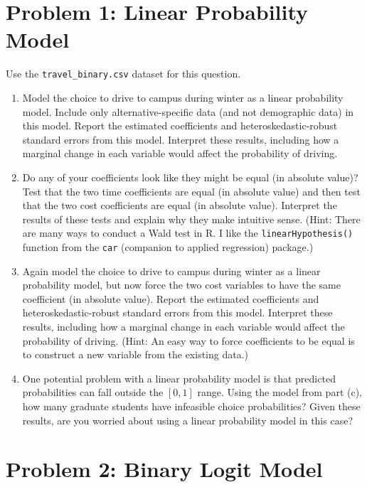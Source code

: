 \documentclass[11pt,letterpaper]{article}
\begin{document}
\section*{Problem 1: Linear Probability Model}

Use the \texttt{travel\_binary.csv} dataset for this question.

\begin{enumerate}[label=\alph*., leftmargin=*]
	\item Model the choice to drive to campus during winter as a linear probability model. Include only alternative-specific data (and not demographic data) in this model. Report the estimated coefficients and heteroskedastic-robust standard errors from this model. Interpret these results, including how a marginal change in each variable would affect the probability of driving.
	
	\item Do any of your coefficients look like they might be equal (in absolute value)? Test that the two time coefficients are equal (in absolute value) and then test that the two cost coefficients are equal (in absolute value). Interpret the results of these tests and explain why they make intuitive sense. (Hint: There are many ways to conduct a Wald test in R. I like the \texttt{linearHypothesis()} function from the \texttt{car} (companion to applied regression) package.) 
	
	\item Again model the choice to drive to campus during winter as a linear probability model, but now force the two cost variables to have the same coefficient (in absolute value). Report the estimated coefficients and heteroskedastic-robust standard errors from this model. Interpret these results, including how a marginal change in each variable would affect the probability of driving. (Hint: An easy way to force coefficients to be equal is to construct a new variable from the existing data.)
	
	\item One potential problem with a linear probability model is that predicted probabilities can fall outside the $[0, 1]$ range. Using the model from part (c), how many graduate students have infeasible choice probabilities? Given these results, are you worried about using a linear probability model in this case?
\end{enumerate}

\section*{Problem 2: Binary Logit Model}
\end{document}
